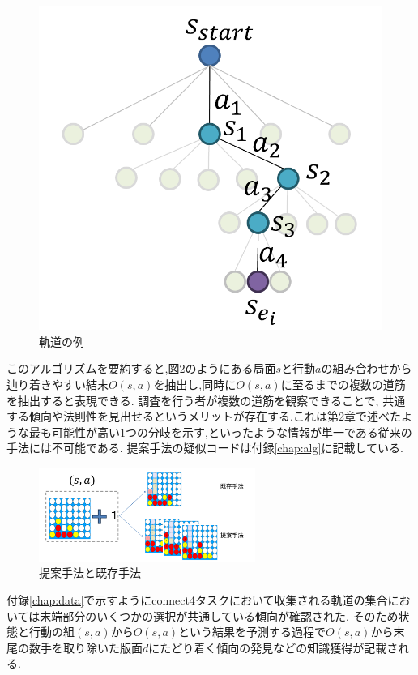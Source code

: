 \begin{figure}[t]
    \centering
    \includegraphics[width=\linewidth]{./figure/traj-example.png}
    \caption{軌道の例}
    \label{fig:step3-4}
\end{figure}
このアルゴリズムを要約すると,図\ref{fig:merit}のようにある局面$s$と行動$a$の組み合わせから辿り着きやすい結末$O(s, a)$を抽出し,同時に$O(s, a)$に至るまでの複数の道筋を抽出すると表現できる.
調査を行う者が複数の道筋を観察できることで,
共通する傾向や法則性を見出せるというメリットが存在する.これは第2章で述べたような最も可能性が高い1つの分岐を示す,といったような情報が単一である従来の手法には不可能である.
提案手法の疑似コードは付録\ref{chap:alg}に記載している.

\begin{figure}[t]
    \includegraphics[width=200pt]{./figure/merit.png}
	\caption{提案手法と既存手法}
	\label{fig:merit}
\end{figure}




付録\ref{chap:data}で示すようにconnect4タスクにおいて収集される軌道の集合においては末端部分のいくつかの選択が共通している傾向が確認された.
そのため状態と行動の組$(s, a)$から$O(s, a)$という結果を予測する過程で$O(s, a)$から末尾の数手を取り除いた版面$d$にたどり着く傾向の発見などの知識獲得が記載される.
